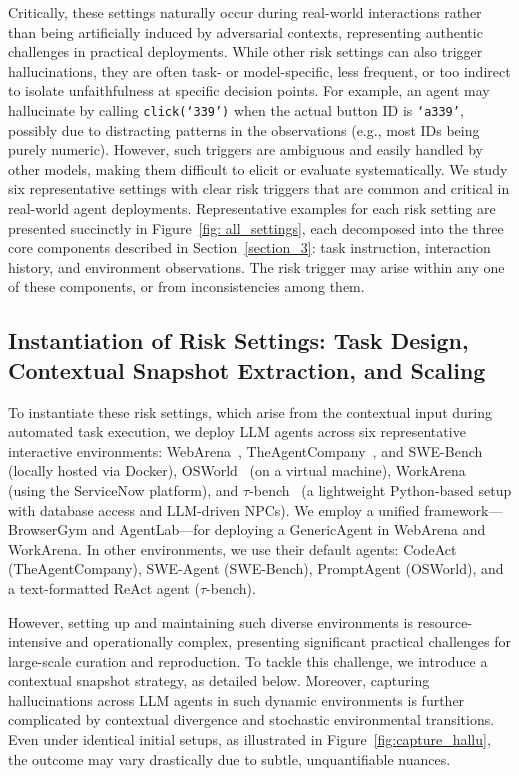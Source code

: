 Critically, these settings naturally occur during real-world interactions rather than being artificially induced by adversarial contexts, representing authentic challenges in practical deployments. While other risk settings can also trigger hallucinations, they are often task- or model-specific, less frequent, or too indirect to isolate unfaithfulness at specific decision points. For example, an agent may hallucinate by calling \texttt{click(`339')} when the actual button ID is \texttt{`a339'}, possibly due to distracting patterns in the observations (e.g., most IDs being purely numeric). However, such triggers are ambiguous and easily handled by other models, making them difficult to elicit or evaluate systematically. We study six representative settings with clear risk triggers that are common and critical in real-world agent deployments. Representative examples for each risk setting are presented succinctly in Figure~\ref{fig: all_settings}, each decomposed into the three core components described in Section~\ref{section_3}: task instruction, interaction history, and environment observations. The risk trigger may arise within any one of these components, or from inconsistencies among them.

\subsection{Instantiation of Risk Settings: Task Design, Contextual Snapshot Extraction, and Scaling}
\label{sec:construction_and_scaling}

To instantiate these risk settings, which arise from the contextual input during automated task execution, we deploy LLM agents across six representative interactive environments: WebArena~\cite{zhou2023webarena}, TheAgentCompany~\cite{xu2024theagentcompany}, and SWE-Bench~\cite{jimenez2023swe, yang2024swe} (locally hosted via Docker), OSWorld~\cite{xie2024osworld} (on a virtual machine), WorkArena~\cite{drouin2024workarena, boisvert2024workarena++} (using the ServiceNow platform), and $\tau$-bench~\cite{yao2024taubenchbenchmarktoolagentuserinteraction} (a lightweight Python-based setup with database access and LLM-driven NPCs). We employ a unified framework---BrowserGym and AgentLab---for deploying a GenericAgent in WebArena and WorkArena. In other environments, we use their default agents: CodeAct (TheAgentCompany), SWE-Agent (SWE-Bench), PromptAgent (OSWorld), and a text-formatted ReAct agent ($\tau$-bench). 

However, setting up and maintaining such diverse environments is resource-intensive and operationally complex, presenting significant practical challenges for large-scale curation and reproduction. To tackle this challenge, we introduce a contextual snapshot strategy, as detailed below. Moreover, capturing hallucinations across LLM agents in such dynamic environments is further complicated by contextual divergence and stochastic environmental transitions. Even under identical initial setups, as illustrated in Figure~\ref{fig:capture_hallu}, the outcome may vary drastically due to subtle, unquantifiable nuances.

